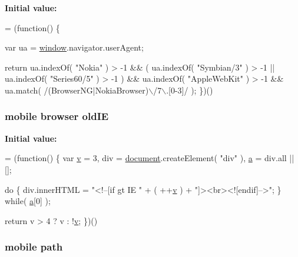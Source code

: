 {\bfseries Initial value\+:}
\begin{DoxyCode}
= (\textcolor{keyword}{function}() \{

    var ua = \hyperlink{jquery_8mobile-1_83_81_8js_ad55530ae1e5978df8e721017c1fc8466}{window}.navigator.userAgent;

    
    \textcolor{keywordflow}{return} ua.indexOf( \textcolor{stringliteral}{"Nokia"} ) > -1 &&
            ( ua.indexOf( \textcolor{stringliteral}{"Symbian/3"} ) > -1 || ua.indexOf( \textcolor{stringliteral}{"Series60/5"} ) > -1 ) &&
            ua.indexOf( \textcolor{stringliteral}{"AppleWebKit"} ) > -1 &&
            ua.match( /(BrowserNG|NokiaBrowser)\(\backslash\)/7\(\backslash\).[0-3]/ );
\})()
\end{DoxyCode}
\hypertarget{jquery_8mobile-1_83_81_8js_abd4431e641ae0612556b08173d3fb7ae}{
\subsubsection[{old\+I\+E}]{\setlength{\rightskip}{0pt plus 5cm}mobile browser old\+I\+E}}\label{jquery_8mobile-1_83_81_8js_abd4431e641ae0612556b08173d3fb7ae}
{\bfseries Initial value\+:}
\begin{DoxyCode}
= (\textcolor{keyword}{function}() \{
    var \hyperlink{jquery_8fancybox_8pack_8js_a207400f40ed647015069564fa40946e1}{v} = 3,
        div = \hyperlink{_col_reorder_8js_aa14f8e0338cced6720590fd2ea13bd4b}{document}.createElement( \textcolor{stringliteral}{"div"} ),
        \hyperlink{chosen_8jquery_8min_8js_a4124bc0a9335c27f086f24ba207a4912}{a} = div.all || [];

    \textcolor{keywordflow}{do} \{
        div.innerHTML = \textcolor{stringliteral}{"<!--[if gt IE "} + ( ++\hyperlink{jquery_8fancybox_8pack_8js_a207400f40ed647015069564fa40946e1}{v} ) + \textcolor{stringliteral}{"]><br><![endif]-->"};
    \} \textcolor{keywordflow}{while}( \hyperlink{chosen_8jquery_8min_8js_a4124bc0a9335c27f086f24ba207a4912}{a}[0] );

    \textcolor{keywordflow}{return} v > 4 ? v : !\hyperlink{jquery_8fancybox_8pack_8js_a207400f40ed647015069564fa40946e1}{v};
\})()
\end{DoxyCode}
\hypertarget{jquery_8mobile-1_83_81_8js_a85880b4fcfb12e8240a306187313f0b4}{
\subsubsection[{path}]{\setlength{\rightskip}{0pt plus 5cm}mobile path}}\label{jquery_8mobile-1_83_81_8js_a85880b4fcfb12e8240a306187313f0b4}
